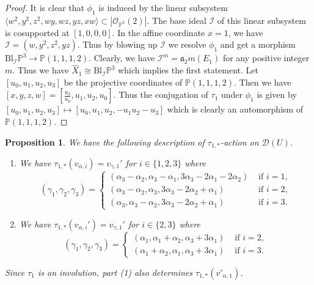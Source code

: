\documentclass[reqno, 12pt]{amsart}
\newtheorem{prop}{Proposition}[section]
\theoremstyle{definition}
\newcommand{\bP}{\mathbb{P}}
\newcommand{\cO}{\mathcal{O}}
\newcommand{\cI}{\mathcal{I}}
\newcommand{\cD}{\mathcal{D}}
\newcommand{\fa}{\mathfrak{a}}
\newcommand{\hX}{\widehat{X}}
\newcommand{\Bl}{\mathrm{Bl}}
\numberwithin{equation}{section}
\begin{document}
\begin{proof}
It is clear that $\phi_1$ is induced by the  linear subsystem $\langle w^2, y^2, z^2, wy, wz, yz, xw \rangle\subset |\cO_{\bP^3}(2)|$. The base ideal $\cI$ of this linear subsystem is cosupported at $[1,0,0,0]$. In the affine coordinate $x=1$, we have $\cI = (w, y^2, z^2, yz)$. Thus by blowing up $\cI$ we resolve $\phi_1$ and get a morphism $\Bl_{\cI} \bP^3 \to \bP(1,1,1,2)$. Clearly, we have $\cI^m = \fa_2m(E_1)$ for any positive integer $m$. Thus we have $\hX_1\cong \Bl_{\cI}\bP^3$ which implies the first statement. Let $[u_0, u_1, u_2, u_3]$ be the projective coordinates of $\bP(1,1,1,2)$. Then we have $[x, y, z, w]= [\frac{u_3}{u_0},  u_1, u_2,u_0]$. Thus the conjugation of $\tau_1$ under $\phi_1$ is given by $[u_0, u_1, u_2, u_3]\mapsto [u_0 ,u_1, u_2, -u_1u_2-u_3]$ which is clearly an automorphism of $\bP(1,1,1,2)$.
\end{proof}

\begin{prop}\label{prop:tau_1-expression}
We have the following description of $\tau_{1,*}$-action on $\cD(U)$. 
\begin{enumerate}
    \item We have $\tau_{1,*}(v_{\alpha, i}) = v_{\gamma,1}'$ for $i \in \{1,2,3\}$ where 
    \[
    (\gamma_1, \gamma_2, \gamma_3)= \begin{cases}
    (\alpha_3-\alpha_2, \alpha_3-\alpha_1, 3\alpha_3 - 2\alpha_1-2\alpha_2) & \textrm{ if } i = 1,\\
    (\alpha_3-\alpha_2, \alpha_3, 3\alpha_3 - 2\alpha_2+ \alpha_1) & \textrm{ if } i = 2,\\
    (\alpha_3, \alpha_3-\alpha_2, 3\alpha_3 - 2\alpha_2+ \alpha_1) & \textrm{ if } i =3.
    \end{cases}
    \]
    \item We have $\tau_{1,*}(v_{\alpha,i}') = v_{\gamma,1}'$ for $i\in \{2,3\}$ where 
    \[
    (\gamma_1, \gamma_2, \gamma_3) =\begin{cases}
    (\alpha_1, \alpha_1+\alpha_2, \alpha_3 + 3\alpha_1) & \textrm{ if } i = 2,\\
    (\alpha_1+\alpha_2, \alpha_1, \alpha_3 + 3\alpha_1) & \textrm{ if } i = 3.
    \end{cases}
    \]
\end{enumerate}
Since \(\tau_1\) is an involution, part (1) also determines $\tau_{1,*}(v'_{\alpha,1})$.
\end{prop}
\end{document}

